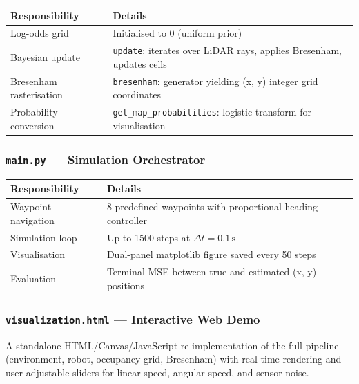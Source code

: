 \documentclass[12pt,a4paper]{article}
\begin{document}
\begin{table}[H]
\centering
\begin{tabular}{@{}p{3.5cm}p{10cm}@{}}
\toprule
\textbf{Responsibility} & \textbf{Details} \\
\midrule
Log-odds grid & Initialised to 0 (uniform prior) \\
Bayesian update & \texttt{update}: iterates over LiDAR rays, applies Bresenham, updates cells \\
Bresenham rasterisation & \texttt{bresenham}: generator yielding (x, y) integer grid coordinates \\
Probability conversion & \texttt{get\_map\_probabilities}: logistic transform for visualisation \\
\bottomrule
\end{tabular}
\end{table}

\subsubsection{\texttt{main.py} --- Simulation Orchestrator}

\begin{table}[H]
\centering
\begin{tabular}{@{}p{3.5cm}p{10cm}@{}}
\toprule
\textbf{Responsibility} & \textbf{Details} \\
\midrule
Waypoint navigation & 8 predefined waypoints with proportional heading controller \\
Simulation loop & Up to 1500 steps at \(\Delta t = 0.1\,\text{s}\) \\
Visualisation & Dual-panel matplotlib figure saved every 50 steps \\
Evaluation & Terminal MSE between true and estimated (x, y) positions \\
\bottomrule
\end{tabular}
\end{table}

\subsubsection{\texttt{visualization.html} --- Interactive Web Demo}

A standalone HTML/Canvas/JavaScript re-implementation of the full pipeline (environment, robot, occupancy grid, Bresenham) with real-time rendering and user-adjustable sliders for linear speed, angular speed, and sensor noise.

\end{document}
